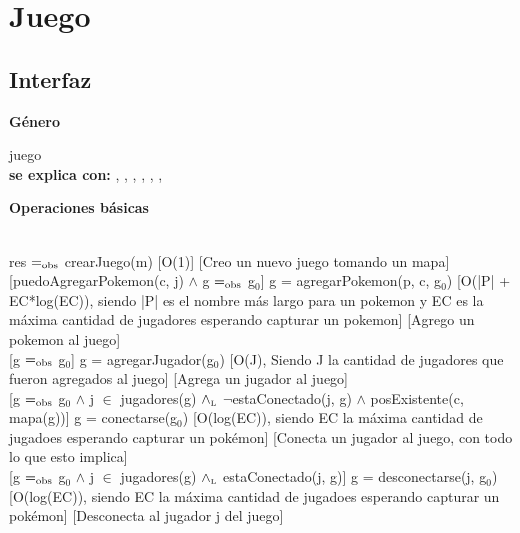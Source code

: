 \section{Juego}

\subsection{Interfaz}

\parbox {1,7cm}{{\bf Género}} juego \\
{\bf se explica con:}  ,  , , , , , \\
\medskip

\parbox {1,5cm}{\bf{Operaciones básicas}}\\

{res $=_{\mathrm{obs}}$ crearJuego(m)}
[O(1)]
[Creo un nuevo juego tomando un mapa]\\

[puedoAgregarPokemon(c, j) $\wedge$ g $=_{\mathrm{obs}}$ g$_0$]
{g = agregarPokemon(p, c, g$_0$)}
[O(|P| + EC*log(EC)), siendo |P| es el nombre más largo para un pokemon y EC es la máxima cantidad de jugadores esperando capturar un pokemon]
[Agrego un pokemon al juego]\\

[g $=_{\mathrm{obs}}$ g$_0$]
{g = agregarJugador(g$_0$)}
[O(J), Siendo J la cantidad de jugadores que fueron agregados al juego]
[Agrega un jugador al juego]\\

[g $=_{\mathrm{obs}}$ g$_0$ $\wedge$ j $\in$ jugadores(g) $\land_{\mathrm{\scriptscriptstyle{L}}}$ $\neg$estaConectado(j, g) $\wedge$ posExistente(c, mapa(g))]
{g = conectarse(g$_0$)}
[O(log(EC)), siendo EC la máxima cantidad de jugadoes esperando capturar un pokémon]
[Conecta un jugador al juego, con todo lo que esto implica]\\

[g $=_{\mathrm{obs}}$ g$_0$ $\wedge$ j $\in$ jugadores(g) $\land_{\mathrm{\scriptscriptstyle{L}}}$ estaConectado(j, g)]
{g = desconectarse(j, g$_0$)}
[O(log(EC)), siendo EC la máxima cantidad de jugadoes esperando capturar un pokémon]
[Desconecta al jugador j del juego]\\

